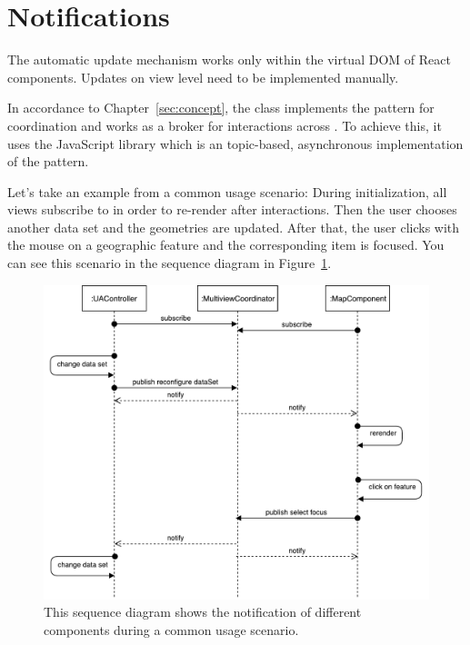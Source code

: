 \section{Notifications}

The automatic update mechanism works only within the virtual DOM of React components.
Updates on view level need to be implemented manually.

In accordance to Chapter~\ref{sec:concept}, the class  implements the  pattern for coordination and works as a broker for interactions across \cmvs{}.
To achieve this, it uses the JavaScript library  which is an topic-based, asynchronous implementation of the pattern.

Let's take an example from a common usage scenario:
During initialization, all views subscribe to  in order to re-render after interactions.
Then the user chooses another data set and the geometries are updated.
After that, the user clicks with the mouse on a geographic feature and the corresponding item is focused.
You can see this scenario in the sequence diagram in Figure~\ref{fig:implementation:sequence-diagram}.

\begin{figure}[ht]
  \centering
  \includegraphics[width=\textwidth]{figures/implementation/SequenceDiagram}
  \caption{%
    This sequence diagram shows the notification of different components during a common usage scenario.
  }\label{fig:implementation:sequence-diagram}
\end{figure}


